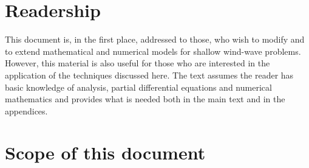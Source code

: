 \documentclass[12pt]{book}
\begin{document}
\section{Readership} \label{sec:read}

This document is, in the first place, addressed to those, who wish to modify and to extend mathematical and numerical
models for shallow wind-wave problems. However, this material is also useful for those who are interested in the application
of the techniques discussed here. The text assumes the reader has basic knowledge of analysis, partial differential
equations and numerical mathematics and provides what is needed both in the main text and in the appendices.

\section{Scope of this document} \label{sec:scope}
\end{document}
